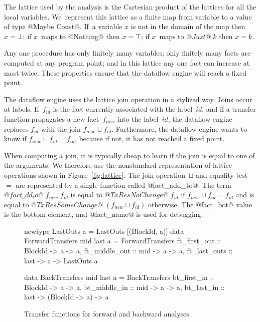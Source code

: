 \documentclass[blockstyle,preprint,natbib,nocopyrightspace]{sigplanconf}
\newcommand\join{\sqcup}
\newcommand\figref[1]{Figure~\ref{fig:#1}}
\newcommand\figlabel[1]{\label{fig:#1}}
\begin{document}
The lattice  used by the analysis is the Cartesian product of the
lattices for all the local variables.
We~represent this lattice as a finite map from variable
to a value of type @Maybe Const@.
If~a variable $x$ is not in the domain of the map then $x=\bot$;
if $x$~maps to @Nothing@ then $x=\top$; if $x$~maps to $@Just@\;k$ then
$x=k$.


Any one procedure has only finitely many variables;
only finitely many facts are computed at any program point;
and in this lattice any one fact can increase at most twice.
These properties
ensure that the dataflow engine will
reach a fixed point.



The dataflow engine uses the lattice join operation in a stylized way.
Joins occur at labels.
If~$f_{\mathit{id}}$ is the fact currently associated with the
label~$\mathit{id}$, 
and if a transfer function propagates a new fact~$f_{\mathit{new}}$
into the label~$\mathit{id}$, 
the dataflow engine replaces $f_{\mathit{id}}$ with
the join  $f_{\mathit{new}} \join f_{\mathit{id}}$.
Furthermore, the dataflow engine wants to know if
  $f_{\mathit{new}} \join f_{\mathit{id}} = f_{\mathit{id}}$,
because if not, it has not reached a fixed point.



When computing a join, 
it is typically cheap to learn if the join
is equal to one of the arguments.
We therefore use the nonstandard representation of lattice operations
shown in \figref{lattice}.
The join operation~$\join$ and equality test~$=$ are represented by a
single function called @fact_add_to@.
The term $@fact_add_to@\;f_{\mathit{new}}\;f_{\mathit{id}}$ is equal to
$@TxRes NoChange@\; f_{\mathit{id}}$ if $f_{\mathit{new}} \join f_{\mathit{id}} = f_{\mathit{id}}$
and is equal to
$@TxRes SomeChange@\; (f_{\mathit{new}} \join f_{\mathit{id}})$ otherwise.
The @fact_bot@ value is the bottom element, 
and @fact_name@  is used for debugging.

\begin{figure}
\begin{code}
newtype LastOuts a = LastOuts [(BlockId, a)]
data ForwardTransfers mid last a = ForwardTransfers
 {ft_first_out  :: BlockId -> a -> a,
  ft_middle_out :: mid     -> a -> a,
  ft_last_outs  :: last    -> a -> LastOuts a} 

data BackTransfers mid last a = BackTransfers
 {bt_first_in  :: BlockId -> a              -> a,
  bt_middle_in :: mid     -> a              -> a,
  bt_last_in   :: last    -> (BlockId -> a) -> a} 
\end{code}
\caption{Transfer functions for forward and backward analyses.}
\figlabel{transfers}
%
%
\end{figure}
\end{document}
